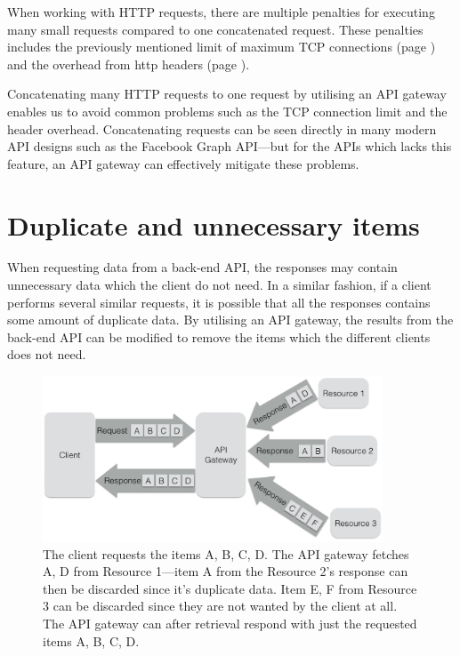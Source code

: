\documentclass{cslthse-msc}
\begin{document}
When working with HTTP requests, there are multiple penalties for executing many small requests compared to one concatenated request. These penalties includes the previously mentioned limit of maximum TCP connections (page \pageref{max_tcp}) and the overhead from http headers (page \pageref{headers}). 

Concatenating many HTTP requests to one request by utilising an API gateway enables us to avoid common problems such as the TCP connection limit and the header overhead. Concatenating requests can be seen directly in many modern API designs such as the Facebook Graph API\cite{facebook_batch_requests}---but for the APIs which lacks this feature, an API gateway can effectively mitigate these problems.

\section{Duplicate and unnecessary items}
When requesting data from a back-end API, the responses may contain unnecessary data which the client do not need. In a similar fashion, if a client performs several similar requests, it is possible that all the responses contains some amount of duplicate data. By utilising an API gateway, the results from the back-end API can be modified to remove the items which the different clients does not need.

\begin{figure}[H]
  \centering
    \begin{center}
      \includegraphics[width=0.9\textwidth]{images/api_gateway_duplicate.png}
    \end{center}
  \caption{The client requests the items A, B, C, D. The API gateway fetches A, D from Resource 1---item A from the Resource 2's response can then be discarded since it's duplicate data. Item E, F from Resource 3 can be discarded since they are not wanted by the client at all. The API gateway can after retrieval respond with just the requested items A, B, C, D.}
\end{figure}
\end{document}
